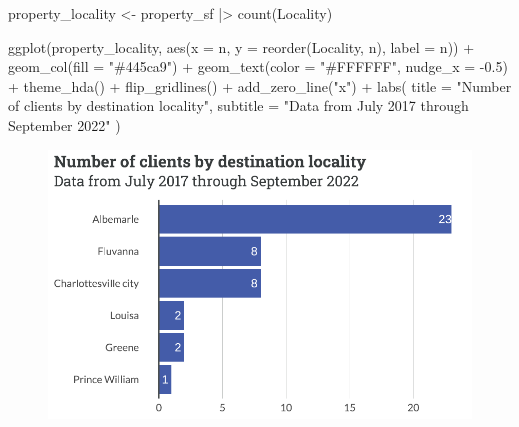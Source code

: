\documentclass[
  letterpaper,
  DIV=11,
  numbers=noendperiod]{scrartcl}
\newenvironment{Shaded}{\begin{snugshade}}{\end{snugshade}}
\newcommand{\AttributeTok}[1]{\textcolor[rgb]{0.40,0.45,0.13}{#1}}
\newcommand{\FloatTok}[1]{\textcolor[rgb]{0.68,0.00,0.00}{#1}}
\newcommand{\FunctionTok}[1]{\textcolor[rgb]{0.28,0.35,0.67}{#1}}
\newcommand{\NormalTok}[1]{\textcolor[rgb]{0.00,0.23,0.31}{#1}}
\newcommand{\OtherTok}[1]{\textcolor[rgb]{0.00,0.23,0.31}{#1}}
\newcommand{\SpecialCharTok}[1]{\textcolor[rgb]{0.37,0.37,0.37}{#1}}
\newcommand{\StringTok}[1]{\textcolor[rgb]{0.13,0.47,0.30}{#1}}
\begin{document}
\begin{Shaded}
\begin{Highlighting}[]
\NormalTok{property\_locality }\OtherTok{\textless{}{-}}\NormalTok{ property\_sf }\SpecialCharTok{|\textgreater{}} 
  \FunctionTok{count}\NormalTok{(Locality)}

\FunctionTok{ggplot}\NormalTok{(property\_locality, }\FunctionTok{aes}\NormalTok{(}\AttributeTok{x =}\NormalTok{ n, }\AttributeTok{y =} \FunctionTok{reorder}\NormalTok{(Locality, n), }\AttributeTok{label =}\NormalTok{ n)) }\SpecialCharTok{+}
  \FunctionTok{geom\_col}\NormalTok{(}\AttributeTok{fill =} \StringTok{"\#445ca9"}\NormalTok{) }\SpecialCharTok{+}
  \FunctionTok{geom\_text}\NormalTok{(}\AttributeTok{color =} \StringTok{"\#FFFFFF"}\NormalTok{, }\AttributeTok{nudge\_x =} \SpecialCharTok{{-}}\FloatTok{0.5}\NormalTok{) }\SpecialCharTok{+}
  \FunctionTok{theme\_hda}\NormalTok{() }\SpecialCharTok{+}
  \FunctionTok{flip\_gridlines}\NormalTok{() }\SpecialCharTok{+}
  \FunctionTok{add\_zero\_line}\NormalTok{(}\StringTok{"x"}\NormalTok{) }\SpecialCharTok{+}
  \FunctionTok{labs}\NormalTok{(}
    \AttributeTok{title =} \StringTok{"Number of clients by destination locality"}\NormalTok{,}
    \AttributeTok{subtitle =} \StringTok{"Data from July 2017 through September 2022"}
\NormalTok{  )}
\end{Highlighting}
\end{Shaded}

\begin{figure}[H]

{\centering \includegraphics{piedmont_files/figure-pdf/property-locality-1.pdf}

}

\end{figure}
\end{document}
